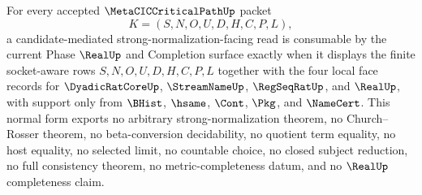 \begin{theorem}
\label{thm:metacic-critical-path-candidate-sn-finite-socket-normal-form}
For every accepted $\MetaCICCriticalPathUp$ packet
$$
K=(S,N,O,U,D,H,C,P,L),
$$
a candidate-mediated strong-normalization-facing read is consumable by the current Phase $\RealUp$ and Completion surface exactly when it displays the finite socket-aware rows $S,N,O,U,D,H,C,P,L$ together with the four local face records for $\DyadicRatCoreUp$, $\StreamNameUp$, $\RegSeqRatUp$, and $\RealUp$, with support only from $\BHist$, $\hsame$, $\Cont$, $\Pkg$, and $\NameCert$. This normal form exports no arbitrary strong-normalization theorem, no Church--Rosser theorem, no beta-conversion decidability, no quotient term equality, no host equality, no selected limit, no countable choice, no closed subject reduction, no full consistency theorem, no metric-completeness datum, and no $\RealUp$ completeness claim.
\end{theorem}
